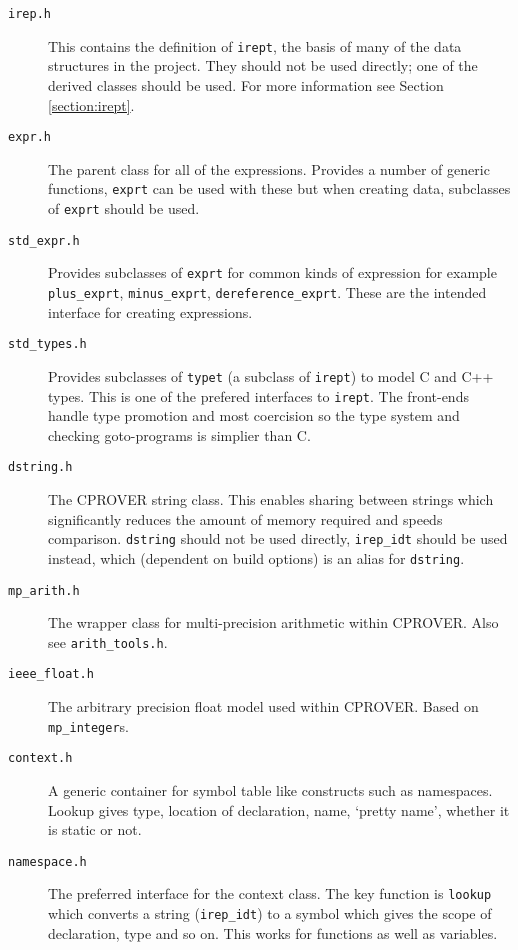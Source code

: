 \documentclass{article}
\newcommand{\file}[1]{\texttt{#1}}
\newcommand{\code}[1]{\texttt{#1}}
\begin{document}
\begin{description}
  \item[\file{irep.h}]{This contains the definition of \code{irept},
    the basis of many of the data structures in the project.  They
    should not be used directly; one of the derived classes should be
    used.  For more information see Section \ref{section:irept}.}
  \item[\file{expr.h}]{The parent class for all of the expressions.
    Provides a number of generic functions, \code{exprt} can be used
    with these but when creating data, subclasses of \code{exprt}
    should be used.}
  \item[\file{std\_expr.h}]{Provides subclasses of \code{exprt} for
    common kinds of expression for example \code{plus\_exprt},
    \code{minus\_exprt}, \code{dereference\_exprt}.  These are the
    intended interface for creating expressions.}
  \item[\file{std\_types.h}]{Provides subclasses of \code{typet} (a
    subclass of \code{irept}) to model C and C++ types.  This is one
    of the prefered interfaces to \code{irept}.  The front-ends handle
    type promotion and most coercision so the type system and checking
    goto-programs is simplier than C.}
  \item[\file{dstring.h}]{The CPROVER string class.  This enables
    sharing between strings which significantly reduces the amount of
    memory required and speeds comparison.  \code{dstring} should not
    be used directly, \code{irep\_idt} should be used instead, which
    (dependent on build options) is an alias for \code{dstring}.}
  \item[\file{mp\_arith.h}]{The wrapper class for multi-precision
    arithmetic within CPROVER.  Also see \file{arith\_tools.h}.}
  \item[\file{ieee\_float.h}]{The arbitrary precision float model used
    within CPROVER.  Based on \code{mp\_integer}s.}
  \item[\file{context.h}]{A generic container for symbol table like
    constructs such as namespaces.  Lookup gives type, location of
    declaration, name, `pretty name', whether it is static or not.}
  \item[\file{namespace.h}]{The preferred interface for the context
    class.  The key function is \code{lookup} which converts a string
    (\code{irep\_idt}) to a symbol which gives the scope of
    declaration, type and so on.  This works for functions as well as variables.}
\end{description}
\end{document}
